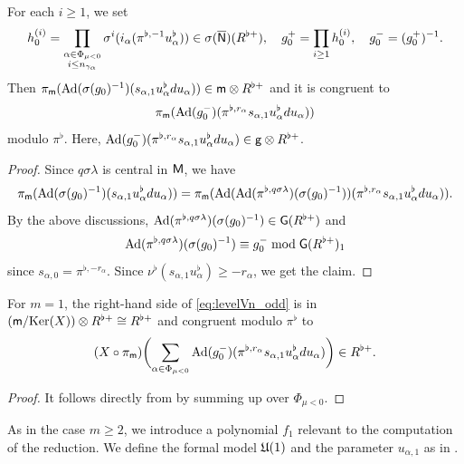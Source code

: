 \documentclass[12pt,reqno]{amsart}
\begin{document}
\begin{lem} \label{lem:reduced_term_m=1}
    For each $i \geq 1$, we set
    \[
        h_0^{(i)} = \prod_{\substack{\alpha \in \Phi_{\mu < 0} \\ i \leq n_{\gamma_\alpha}}} \sigma^i(i_\alpha(\pi^{\flat,- 1} u_\alpha^\flat)) \in \sigma({\mathsf{{\overline{N}}}})(R^{\flat+}), \quad g^+_0 = \prod_{i \geq 1} h_0^{(i)}, \quad g_0^- = (g^+_0)^{-1}. 
    \]
    Then $\pi_{{\mathsf{m}}}({\operatorname{Ad}}(\sigma(g_0)^{-1})(s_{\alpha, 1} u_\alpha^\flat du_\alpha)) \in {\mathsf{m}} \otimes R^{\flat +}$ and it is congruent to
    \[
        \pi_{{\mathsf{m}}}({\operatorname{Ad}}(g^-_0)(\pi^{\flat, r_\alpha} s_{\alpha, 1} u_\alpha^\flat du_\alpha))
    \]
    modulo $\pi^\flat$. Here, ${\operatorname{Ad}}(g^-_0)(\pi^{\flat, r_\alpha} s_{\alpha, 1} u_\alpha^\flat du_\alpha) \in {\mathsf{g}} \otimes R^{\flat +}$. 
\end{lem}
\begin{proof}
    Since $q\sigma \lambda$ is central in ${\mathsf{M}}$, we have 
    \[
        \pi_{{\mathsf{m}}}({\operatorname{Ad}}(\sigma(g_0)^{-1})(s_{\alpha, 1} u_\alpha^\flat du_\alpha)) = \pi_{{\mathsf{m}}}({\operatorname{Ad}}({\operatorname{Ad}}(\pi^{\flat, q \sigma \lambda})(\sigma(g_0)^{-1}))(\pi^{\flat, r_\alpha} s_{\alpha, 1} u_\alpha^\flat du_\alpha)). 
    \]
    By the above discussions, ${\operatorname{Ad}}(\pi^{\flat, q \sigma \lambda})(\sigma(g_0)^{-1}) \in {\mathsf{G}}(R^{\flat +})$ and 
    \[
        {\operatorname{Ad}}(\pi^{\flat, q \sigma \lambda})(\sigma(g_0)^{-1}) \equiv g_0^- \bmod{{\mathsf{G}}(R^{\flat +})_1}
    \]
    since $s_{\alpha, 0} = \pi^{\flat, -r_\alpha}$. Since $\nu^\flat(s_{\alpha, 1} u_\alpha^\flat) \geq - r_\alpha$, we get the claim. 
\end{proof}

\begin{prop} \label{prop:levelVn_m=1_modulo}
    For $m = 1$, the right-hand side of \eqref{eq:levelVn_odd} is in 
    $
        ({\mathsf{m}} / {\operatorname{Ker}}(X)) \otimes R^{\flat +} \cong R^{\flat +}
    $
    and congruent modulo $\pi^{\flat}$ to 
    \[
        (X \circ \pi_{{\mathsf{m}}})\biggl(\sum_{\alpha \in \Phi_{\mu < 0}} {\operatorname{Ad}}(g^-_0)(\pi^{\flat, r_\alpha} s_{\alpha, 1} u_\alpha^\flat du_\alpha)\biggr) \in R^{\flat +}. 
    \]
\end{prop}
\begin{proof}
    It follows directly from  by summing up over $\Phi_{\mu < 0}$. 
\end{proof}

As in the case $m \geq 2$, we introduce a polynomial $f_1$ relevant to the computation of the reduction. We define the formal model ${\mathfrak{U}}(1)$ and the parameter $u_{\alpha, 1}$ as in . 
\end{document}
